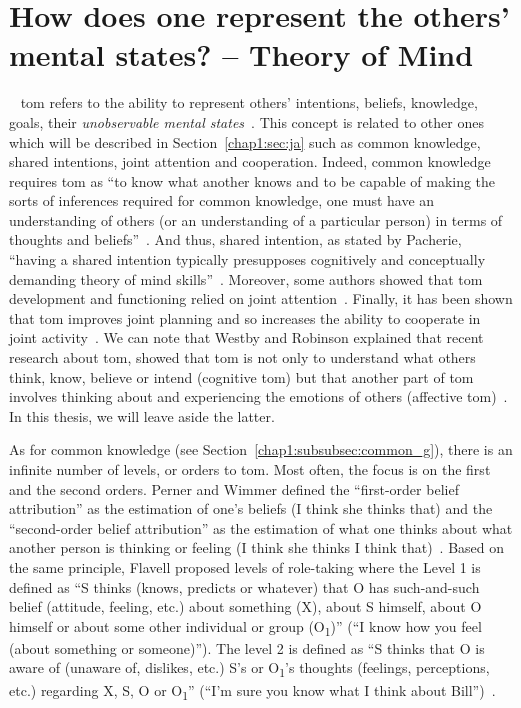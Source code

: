 \documentclass[a4paper,11pt,twoside]{StyleThese}
\begin{document}
\section{How does one represent the others' mental states? -- Theory of Mind}~\label{chap1:sec:tom}
\acrfull{tom} refers to the ability to represent others' intentions, beliefs, knowledge, goals, \ie their \emph{unobservable mental states}~\cite{premack_1978_does,povinelli_2004_we}. This concept is related to other ones which will be described in Section~\ref{chap1:sec:ja} such as common knowledge, shared intentions, joint attention and cooperation. Indeed, common knowledge requires \acrshort{tom} as ``to know what another knows and to be capable of making the sorts of inferences required for common knowledge, one must have an understanding of others (or an understanding of a particular person) in terms of thoughts and beliefs''~\cite[p.~82]{tollefsen_2005_let}. And thus, shared intention, as stated by Pacherie, ``having a shared intention typically presupposes cognitively and conceptually demanding theory of mind skills''~\cite[p.~1817]{pacherie_2013_intentional}. Moreover, some authors showed that \acrshort{tom} development and functioning relied on joint attention~\cite{sodian_2015_declarative, camaioni_2004_role}.  Finally, it has been shown that \acrshort{tom} improves joint planning and so increases the ability to cooperate in joint activity~\cite{astington_1995_theory}. We can note that Westby and Robinson explained that recent research about \acrshort{tom}, showed that \acrshort{tom} is not only to understand what others think, know, believe or intend (cognitive \acrshort{tom}) but that another part of \acrshort{tom} involves thinking about and experiencing the emotions of others (affective \acrshort{tom})~\cite{westby_2014_developmental}. In this thesis, we will leave aside the latter.

As for common knowledge (see Section~\ref{chap1:subsubsec:common_g}), there is an infinite number of levels, or orders to \acrshort{tom}. Most often, the focus is on the first and the second orders. Perner and Wimmer defined the ``first-order belief attribution'' as the estimation of one's beliefs (\eg I think she thinks that) and the ``second-order belief attribution'' as the estimation of what one  thinks about what another person is thinking or feeling (\eg I think she thinks I think that)~\cite{perner_1985_john}. Based on the same principle, Flavell \etal{} proposed levels of role-taking where the Level 1 is defined as ``S thinks (knows, predicts or whatever) that O has such-and-such belief (attitude, feeling, etc.) about something (X), about S himself, about O himself or about some other individual or group (O\textsubscript{1})'' (\eg ``I know how you feel (about something or someone)''). The level 2 is defined as ``S thinks that O is aware of (unaware of, dislikes, etc.) S's or O\textsubscript{1}'s thoughts (feelings, perceptions, etc.) regarding X, S, O or O\textsubscript{1}'' (\eg ``I'm sure you know what I think about Bill'')~\cite[pp.~49--51]{flavell_1968_development}.
\end{document}
